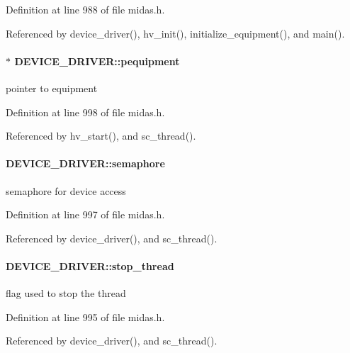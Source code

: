 Definition at line 988 of file midas.h.

Referenced by device\_\-driver(), hv\_\-init(), initialize\_\-equipment(), and main().
\paragraph[{pequipment}]{$\ast$ {\bf DEVICE\_\-DRIVER::pequipment}}\hfill\label{structDEVICE__DRIVER_a0c44eefaa711ea871881308c507c8b00}
pointer to equipment 

Definition at line 998 of file midas.h.

Referenced by hv\_\-start(), and sc\_\-thread().
\paragraph[{semaphore}]{ {\bf DEVICE\_\-DRIVER::semaphore}}\hfill\label{structDEVICE__DRIVER_a8233d106afdba2ec9eafefad8cc9a7a0}
semaphore for device access 

Definition at line 997 of file midas.h.

Referenced by device\_\-driver(), and sc\_\-thread().
\paragraph[{stop\_\-thread}]{ {\bf DEVICE\_\-DRIVER::stop\_\-thread}}\hfill\label{structDEVICE__DRIVER_a4dc7498cbf9c5c57a6d1b90aa7a7db6a}
flag used to stop the thread 

Definition at line 995 of file midas.h.

Referenced by device\_\-driver(), and sc\_\-thread().